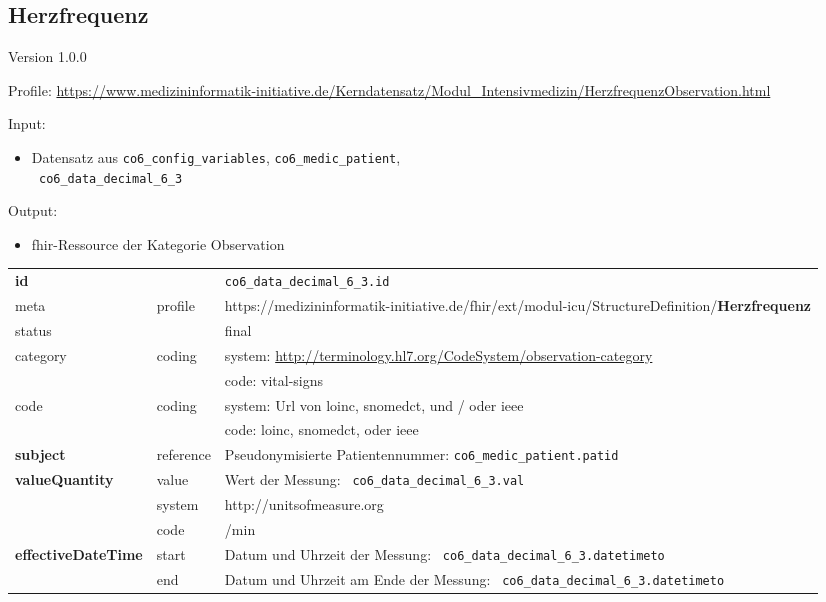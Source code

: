 \subsection{Herzfrequenz} 
\noindent Version 1.0.0

\noindent Profile: \url{https://www.medizininformatik-initiative.de/Kerndatensatz/Modul_Intensivmedizin/HerzfrequenzObservation.html}

\noindent Input:
\begin{itemize}
	\item Datensatz aus \texttt{co6\_config\_variables}, \texttt{co6\_medic\_patient}, \\ \texttt{
co6\_data\_decimal\_6\_3}
\end{itemize}
Output:
\begin{itemize}
        \item \ac{fhir}-Ressource der Kategorie \glqq Observation\grqq{}
\end{itemize}
\begin{longtable}{|l|l|p{7.5cm}|}
        \hline
        \rowcolor{lightgray} \multicolumn{3}{|l|}{Data Mapping (inhaltlich)} \\ \hline
        \textbf{id} &  & \texttt{co6\_data\_decimal\_6\_3.id} \\ \hline
	meta & profile & https://medizininformatik-initiative.de/fhir/ext/modul-icu/StructureDefinition/\textbf{Herzfrequenz} \\ \hline 
	status &  & final   \\ \hline 
	category & coding & system: \url{http://terminology.hl7.org/CodeSystem/observation-category} \\
\cline{3-3}
	& & code: vital-signs\\ \hline
	code & coding & system: Url von \ac{loinc}, \ac{snomedct}, und / oder \ac{ieee} \\ 
	\cline{3-3} 
	 &  & code: \ac{loinc}, \ac{snomedct}, oder \ac{ieee} \\ \hline
	 \textbf{subject}  & reference & Pseudonymisierte Patientennummer: \texttt{co6\_medic\_patient.patid} \\ \hline
	 \textbf{valueQuantity}  & value & Wert der Messung: \texttt{
co6\_data\_decimal\_6\_3.val} \\
        \cline{2-3}
         & system & http://unitsofmeasure.org \\
         \cline{2-3}
         & code & /min \\ \hline
     \textbf{effectiveDateTime}  & start & Datum und Uhrzeit der Messung: \texttt{
co6\_data\_decimal\_6\_3.datetimeto} \\
    \cline{2-3}
     & end & Datum und Uhrzeit am Ende der Messung: \texttt{
co6\_data\_decimal\_6\_3.datetimeto} \\ \hline
\end{longtable}



